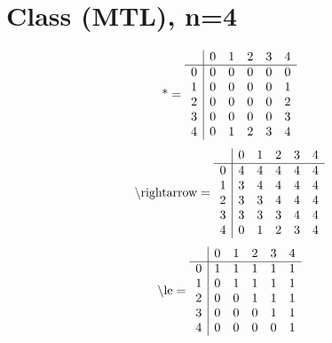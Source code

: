 \documentclass[11pt]{article}
\begin{document}
\section{Class (MTL), n=4}
\[\text{*} = 
\begin{array}{r | r r r r r}
 & 0 & 1 & 2 & 3 & 4 \\ \hline
0 & 0 & 0 & 0 & 0 & 0 \\
1 & 0 & 0 & 0 & 0 & 1 \\
2 & 0 & 0 & 0 & 0 & 2 \\
3 & 0 & 0 & 0 & 0 & 3 \\
4 & 0 & 1 & 2 & 3 & 4 \\
\end{array}
\]
\[\text{\textbackslash rightarrow} = 
\begin{array}{r | r r r r r}
 & 0 & 1 & 2 & 3 & 4 \\ \hline
0 & 4 & 4 & 4 & 4 & 4 \\
1 & 3 & 4 & 4 & 4 & 4 \\
2 & 3 & 3 & 4 & 4 & 4 \\
3 & 3 & 3 & 3 & 4 & 4 \\
4 & 0 & 1 & 2 & 3 & 4 \\
\end{array}
\]
\[\text{\textbackslash le} = 
\begin{array}{r | r r r r r}
 & 0 & 1 & 2 & 3 & 4 \\ \hline
0 & 1 & 1 & 1 & 1 & 1 \\
1 & 0 & 1 & 1 & 1 & 1 \\
2 & 0 & 0 & 1 & 1 & 1 \\
3 & 0 & 0 & 0 & 1 & 1 \\
4 & 0 & 0 & 0 & 0 & 1 \\
\end{array}
\]
\end{document}
